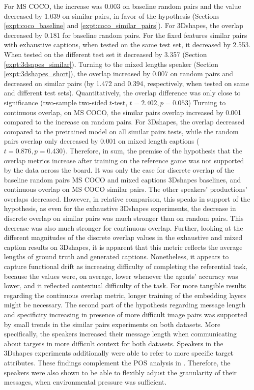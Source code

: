For MS COCO, the increase was 0.003 on baseline random pairs and the value decreased by 1.039 on similar pairs, in favor of the hypothesis (Sections \ref{expt:coco_baseline} and \ref{expt:coco_similar_pairs}). 
For 3Dshapes, the overlap decreased by 0.181 for baseline random pairs. For the fixed features similar pairs with exhaustive captions, when tested on the same test set, it decreased by 2.553. When tested on the different test set it decreased by 3.357 (Section \ref{expt:3dsapes_similar}). Turning to the mixed lengths speaker (Section \ref{expt:3dshapes_short}), the overlap increased by 0.007 on random pairs and decreased on similar pairs (by 1.472 and 0.394, respectively, when tested on same and different test sets). Quantitatively, the overlap difference was only close to significance (two-sample two-sided $t$-test, $t= 2.402, p = 0.053$)
Turning to continuous overlap, on MS COCO, the similar pairs overlap increased by 0.001 compared to the increase on random pairs. For 3Dshapes, the overlap decreased compared to the pretrained model on all similar pairs tests, while the random pairs overlap only decreased by 0.001 on mixed length captions ($t=0.876, p=0.430$).
Therefore, in sum, the premise of the hypothesis that the overlap metrics increase after training on the reference game was not supported by the data across the board. It was only the case for discrete overlap of the baseline random pairs MS COCO and mixed captions 3Dshapes baselines, and continuous overlap on MS COCO similar pairs. The other speakers' productions' overlaps decreased. However, in relative comparison, this speaks in support of the hypothesis, as even for the exhaustive 3Dshapes experiments, the decrease in discrete overlap on similar pairs was much stronger than on random pairs. This decrease was also much stronger for continuous overlap. 
Further, looking at the different magnitudes of the discrete overlap values in the exhaustive and mixed caption results on 3Dshapes, it is apparent that this metric reflects the average lengths of ground truth and generated captions.
Nonetheless, it appears to capture functional drift as increasing difficulty of completing the referential task, because the values were, on average, lower whenever the agents' accuracy was lower, and it reflected contextual difficulty of the task. For more tangible results regarding the continuous overlap metric, longer training of the embedding layers might be necessary.
The second part of the hypothesis regarding message length and specificity increasing in presence of more difficult image pairs was supported by small trends in the similar pairs experiments on both datasets. More specifically, the speakers increased their message length when communicating about targets in more difficult context for both datasets. Speakers in the 3Dshapes experiments additionally were able to refer to more specific target attributes. These findings complement the POS analysis in \cite{lee2019countering}. Therefore, the speakers were also shown to be able to flexibly adjust the granularity of their messages, when environmental pressure was sufficient.\newline
